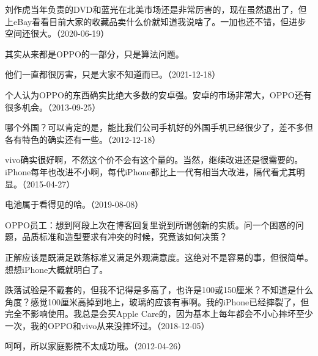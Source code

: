 刘作虎当年负责的DVD和蓝光在北美市场还是非常厉害的，现在虽然退出了，但上eBay看看目前大家的收藏品卖什么价就知道我说啥了。一加也还不错，但进步空间还很大。（2020-06-19）


其实从来都是OPPO的一部分，只是算法问题。


他们一直都很厉害，只是大家不知道而已。（2021-12-18）

个人认为OPPO的东西确实比绝大多数的安卓强。安卓的市场非常大，OPPO还有很多机会。（2013-09-25）


哪个外国？可以肯定的是，能比我们公司手机好的外国手机已经很少了，差不多但各有特色的确实还有一些。（2012-12-18）


vivo确实很好啊，不然这个价不会有这个量的。当然，继续改进还是很需要的。iPhone每年也改进不小啊，每代iPhone都比上一代有相当大改进，隔代看尤其明显。（2015-04-27）


电池属于看得见的哈。（2019-08-08）

OPPO员工：想到阿段上次在博客回复里说到所谓创新的实质。问一个困惑的问题，品质标准和造型要求有冲突的时候，究竟该如何决策？

正解应该是既满足跌落标准又满足外观满意度。这绝对不是容易的事，但很简单。想想iPhone大概就明白了。

跌落试验是不戴套的，但我不记得是多高了，也许是100或150厘米？不知道是什么角度？感觉100厘米高掉到地上，玻璃的应该有事啊。我的iPhone已经摔裂了，但完全不影响使用。我总是会买Apple Care的，因为基本上每年都会不小心摔坏至少一次，我的OPPO和vivo从来没摔坏过。（2018-12-05）


呵呵，所以家庭影院不太成功哦。（2012-04-26）


